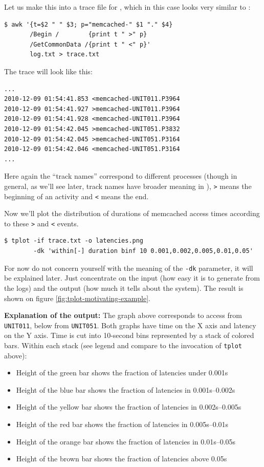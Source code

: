 \documentclass{article}
\begin{document}
Let us make this into a trace file for \timeplot{}, which in this case looks very similar to \splot{}:
\begin{verbatim}
$ awk '{t=$2 " " $3; p="memcached-" $1 "." $4}
       /Begin /        {print t " >" p} 
       /GetCommonData /{print t " <" p}'
       log.txt > trace.txt
\end{verbatim}

The trace will look like this:
\begin{verbatim}
...
2010-12-09 01:54:41.853 <memcached-UNIT011.P3964
2010-12-09 01:54:41.927 >memcached-UNIT011.P3964
2010-12-09 01:54:41.928 <memcached-UNIT011.P3964
2010-12-09 01:54:42.045 >memcached-UNIT051.P3832
2010-12-09 01:54:42.045 >memcached-UNIT051.P3164
2010-12-09 01:54:42.046 <memcached-UNIT051.P3164
...
\end{verbatim}

Here again the ``track names'' correspond to different processes (though in general, as we'll see later, track names have broader meaning in \timeplot{}), \verb|>| means the beginning of an activity and \verb|<| means the end.

Now we'll plot the distribution of durations of memcached access times according to these \verb|>| and \verb|<| events.

\begin{verbatim}
$ tplot -if trace.txt -o latencies.png
        -dk 'within[-] duration binf 10 0.001,0.002,0.005,0.01,0.05'
\end{verbatim}

For now do not concern yourself with the meaning of the \verb|-dk| parameter, it will be explained later. Just concentrate on the input (how easy it is to generate from the logs) and the output (how much it tells about the system). The result is shown on figure \ref{fig:tplot-motivating-example}.

\textbf{Explanation of the output:} The graph above corresponds to access from \verb|UNIT011|, below from \verb|UNIT051|. Both graphs have time on the X axis and latency on the Y axis. Time is cut into 10-second bins represented by a stack of colored bars. Within each stack (see legend and compare to the invocation of \verb|tplot| above):
\begin{itemize}
\item Height of the green bar shows the fraction of latencies under 0.001s
\item Height of the blue bar shows the fraction of latencies in 0.001s--0.002s
\item Height of the yellow bar shows the fraction of latencies in 0.002s--0.005s
\item Height of the red bar shows the fraction of latencies in 0.005s--0.01s
\item Height of the orange bar shows the fraction of latencies in 0.01s--0.05s
\item Height of the brown bar shows the fraction of latencies above 0.05s
\end{itemize}
\end{document}
